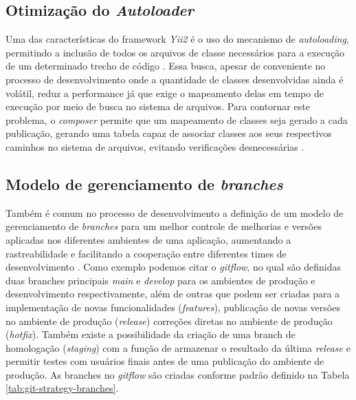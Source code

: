 \documentclass[nonacm, sigconf]{acmart}
\begin{document}
\subsection{Otimização do \textit{Autoloader}}
\label{section:api-autoloader-optimization}

Uma das características do framework \textit{Yii2} é o uso do mecanismo de \textit{autoloading}, permitindo a inclusão de todos os arquivos de classe necessários para a execução de um determinado trecho de código \cite{yii2-autoloader}. Essa busca, apesar de conveniente no processo de desenvolvimento onde a quantidade de classes desenvolvidas ainda é volátil, reduz a performance já que exige o mapeamento delas em tempo de execução por meio de busca no sistema de arquivos. Para contornar este problema, o \textit{composer} permite que um mapeamento de classes seja gerado a cada publicação, gerando uma tabela capaz de associar classes aos seus respectivos caminhos no sistema de arquivos, evitando verificações desnecessárias \cite{composer-autoloader}.

\subsection{Modelo de gerenciamento de \textit{branches}}
\label{section:git-strategy}
Também é comum no processo de desenvolvimento a definição de um modelo de gerenciamento de \textit{branches} para um melhor controle de melhorias e versões aplicadas nos diferentes ambientes de uma aplicação, aumentando a rastreabilidade e facilitando a cooperação entre diferentes times de desenvolvimento \cite{uppala2024software}. Como exemplo podemos citar o \textit{gitflow}, no qual são definidas duas branches principais \textit{main} e \textit{develop} para os ambientes de produção e desenvolvimento respectivamente, além de outras que podem ser criadas para a implementação de novas funcionalidades (\textit{features}), publicação de novas versões no ambiente de produção (\textit{release}) correções diretas no ambiente de produção (\textit{hotfix}). Também existe a possibilidade da criação de uma branch de homologação (\textit{staging}) com a função de armazenar o resultado da última \textit{release} e permitir testes com usuários finais antes de uma publicação do ambiente de produção. As branches no \textit{gitflow} são criadas conforme padrão definido na Tabela \ref{tab:git-strategy-branches}.
\end{document}
